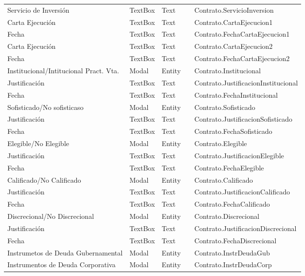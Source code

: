 \begin{table}[H]
{\begin{tabular}{ p{4cm} p{2cm} p{2cm} p{3cm} p{8cm} }
		Servicio de Inversi\'on &
		TextBox &
		Text &
		 &
		Contrato.ServicioInversion \\
		Carta Ejecuci\'on &
		TextBox &
		Text &
		 &
		Contrato.CartaEjecucion1 \\
		Fecha &
		TextBox &
		Text &
		 &
		Contrato.FechaCartaEjecucion1 \\
		Carta Ejecuci\'on &
		TextBox &
		Text &
		 &
		Contrato.CartaEjecucion2 \\
		Fecha &
		TextBox &
		Text &
		 &
		Contrato.FechaCartaEjecucion2 \\
		Institucional/Intitucional Pract. Vta. &
		Modal &
		Entity &
		 &
		Contrato.Institucional \\
		Justificaci\'on &
		TextBox &
		Text &
		 &
		Contrato.JustificacionInstitucional \\
		Fecha &
		TextBox &
		Text &
		 &
		Contrato.FechaInstitucional \\
		Sofisticado/No sofisticaso &
		Modal &
		Entity &
		 &
		Contrato.Sofisticado \\
		Justificaci\'on &
		TextBox &
		Text &
		 &
		Contrato.JustificacionSofisticado \\
		Fecha &
		TextBox &
		Text &
		 &
		Contrato.FechaSofisticado \\
		Elegible/No Elegible &
		Modal &
		Entity &
		 &
		Contrato.Elegible \\
		Justificaci\'on &
		TextBox &
		Text &
		 &
		Contrato.JustificacionElegible \\
		Fecha &
		TextBox &
		Text &
		 &
		Contrato.FechaElegible \\
		Calificado/No Calificado &
		Modal &
		Entity &
		 &
		Contrato.Calificado \\
		Justificaci\'on &
		TextBox &
		Text &
		 &
		Contrato.JustificacionCalificado \\
		Fecha &
		TextBox &
		Text &
		 &
		Contrato.FechaCalificado \\
		Discrecional/No Discrecional &
		Modal &
		Entity &
		 &
		Contrato.Discrecional \\
		Justificaci\'on &
		TextBox &
		Text &
		 &
		Contrato.JustificacionDiscrecional \\
		Fecha &
		TextBox &
		Text &
		 &
		Contrato.FechaDiscrecional \\
		Instrumetos de Deuda Gubernamental &
		Modal &
		Entity &
		 &
		Contrato.InstrDeudaGub \\
		Instrumentos de Deuda Corporativa &
		Modal &
		Entity &
		 &
		Contrato.InstrDeudaCorp \\

\end{tabular}}
\end{table}
